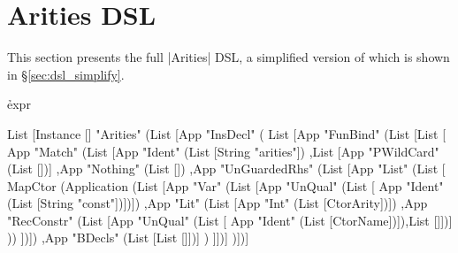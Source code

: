 \documentclass{llncs}
\begin{document}
\appendix

\section{Arities DSL}
\label{sec:arities_full}

This section presents the full |Arities| DSL, a simplified version of which is shown in \S\ref{sec:dsl_simplify}.

\h{expr}\begin{code}
List [Instance [] "Arities" (List [App "InsDecl" (
    List [App "FunBind" (List [List [
        App "Match" (List
            [App "Ident" (List [String "arities"])
            ,List [App "PWildCard" (List [])]
            ,App "Nothing" (List [])
            ,App "UnGuardedRhs" (List [App "List" (List [
                MapCtor (Application (List
                    [App "Var" (List [App "UnQual" (List [
                        App "Ident" (List [String "const"])])])
                    ,App "Lit" (List [App "Int" (List [CtorArity])])
                    ,App "RecConstr" (List [App "UnQual" (List [
                        App "Ident" (List [CtorName])]),List []])]
                ))
            ])])
            ,App "BDecls" (List [List []])]
        )
    ]])]
)])]
\end{code}


\balance

\end{document}
